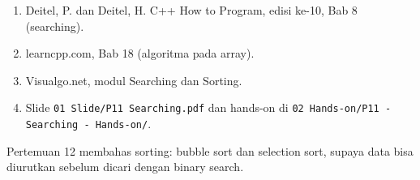 \documentclass[a4paper]{article}
\begin{document}
\begin{enumerate}
\item Deitel, P. dan Deitel, H. C++ How to Program, edisi ke-10, Bab 8 (searching).
\item learncpp.com, Bab 18 (algoritma pada array).
\item Visualgo.net, modul Searching dan Sorting.
\item Slide \texttt{01 Slide/P11 Searching.pdf} dan hands-on di \texttt{02 Hands-on/P11 - Searching - Hands-on/}.
\end{enumerate}
\begin{Penting}
Pertemuan 12 membahas sorting: bubble sort dan selection sort, supaya data bisa diurutkan sebelum dicari dengan binary search.
\end{Penting}
\end{document}
